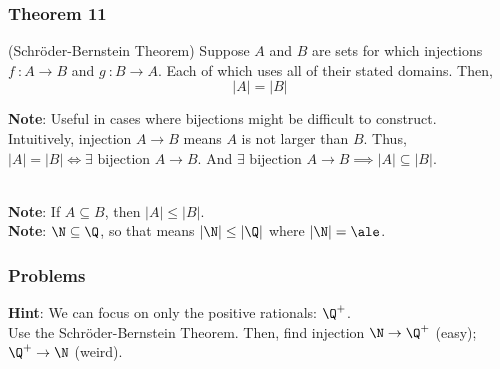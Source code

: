                     \subsubsection{Theorem 11}

            \begin{ntheorem}
                (Schröder-Bernstein Theorem) Suppose $A$ and $B$ are sets for which injections $f \ \colon A \rightarrow B$ and $g \ \colon B \rightarrow A$. Each of which uses all of their stated domains. Then, $$|A| = |B|$$
            \end{ntheorem}

            \textbf{Note}: Useful in cases where bijections might be difficult to construct. \\

            Intuitively, injection $A \rightarrow B$ means $A$ is not larger than $B$. Thus, $|A| = |B| \iff \exists \text{ bijection } A \rightarrow B$. And $ \exists  \text{ bijection } A \rightarrow B \implies |A| \subseteq |B|$.
            
             \\

            \noindent \textbf{Note}: If $A \subseteq B$, then $|A| \leq |B|$. \\
            \textbf{Note}: $\N \subseteq \Q$, so that means $|\N| \leq |\Q|$ where $|\N| = \ale$.

        \subsubsection{Problems}


            \textbf{Hint}: We can focus on only the positive rationals: $\Q^+$. \\
            Use the Schröder-Bernstein Theorem. Then, find injection $\N \rightarrow \Q^+$ (easy); $\Q^+ \rightarrow \N$ (weird).

